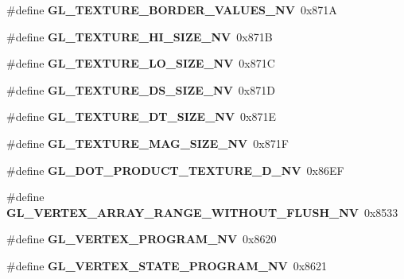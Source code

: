 \begin{DoxyCompactItemize}
\item 
\#define {\bfseries G\+L\+\_\+\+T\+E\+X\+T\+U\+R\+E\+\_\+\+B\+O\+R\+D\+E\+R\+\_\+\+V\+A\+L\+U\+E\+S\+\_\+\+N\+V}~0x871\+A\label{_s_d_l__opengl_8h_ac27b09140276f0c0be05810bfcdecd25}

\item 
\#define {\bfseries G\+L\+\_\+\+T\+E\+X\+T\+U\+R\+E\+\_\+\+H\+I\+\_\+\+S\+I\+Z\+E\+\_\+\+N\+V}~0x871\+B\label{_s_d_l__opengl_8h_af06bbc3cc0c8a58695d51eecc4a46266}

\item 
\#define {\bfseries G\+L\+\_\+\+T\+E\+X\+T\+U\+R\+E\+\_\+\+L\+O\+\_\+\+S\+I\+Z\+E\+\_\+\+N\+V}~0x871\+C\label{_s_d_l__opengl_8h_acfd2712d4f614f6e104b3e827fbbdafc}

\item 
\#define {\bfseries G\+L\+\_\+\+T\+E\+X\+T\+U\+R\+E\+\_\+\+D\+S\+\_\+\+S\+I\+Z\+E\+\_\+\+N\+V}~0x871\+D\label{_s_d_l__opengl_8h_a7e0cccbd301acea7565c83fb76210d87}

\item 
\#define {\bfseries G\+L\+\_\+\+T\+E\+X\+T\+U\+R\+E\+\_\+\+D\+T\+\_\+\+S\+I\+Z\+E\+\_\+\+N\+V}~0x871\+E\label{_s_d_l__opengl_8h_a92b8f60e59c2e7aff796b1710b43b92f}

\item 
\#define {\bfseries G\+L\+\_\+\+T\+E\+X\+T\+U\+R\+E\+\_\+\+M\+A\+G\+\_\+\+S\+I\+Z\+E\+\_\+\+N\+V}~0x871\+F\label{_s_d_l__opengl_8h_ac29092d4ed56e0cabad91605a07aa069}

\item 
\#define {\bfseries G\+L\+\_\+\+D\+O\+T\+\_\+\+P\+R\+O\+D\+U\+C\+T\+\_\+\+T\+E\+X\+T\+U\+R\+E\+\_\+D\+\_\+\+N\+V}~0x86\+E\+F\label{_s_d_l__opengl_8h_a1d0feb369a16b6771ec7e384e771cea5}

\item 
\#define {\bfseries G\+L\+\_\+\+V\+E\+R\+T\+E\+X\+\_\+\+A\+R\+R\+A\+Y\+\_\+\+R\+A\+N\+G\+E\+\_\+\+W\+I\+T\+H\+O\+U\+T\+\_\+\+F\+L\+U\+S\+H\+\_\+\+N\+V}~0x8533\label{_s_d_l__opengl_8h_a228f1e25b6f758b6152ad4fd289a8603}

\item 
\#define {\bfseries G\+L\+\_\+\+V\+E\+R\+T\+E\+X\+\_\+\+P\+R\+O\+G\+R\+A\+M\+\_\+\+N\+V}~0x8620\label{_s_d_l__opengl_8h_ab5a7778b2748992e5770a4a627a645fa}

\item 
\#define {\bfseries G\+L\+\_\+\+V\+E\+R\+T\+E\+X\+\_\+\+S\+T\+A\+T\+E\+\_\+\+P\+R\+O\+G\+R\+A\+M\+\_\+\+N\+V}~0x8621\label{_s_d_l__opengl_8h_a9f4b909ccf5a60b7499d1bc274f66d1a}


\end{DoxyCompactItemize}
